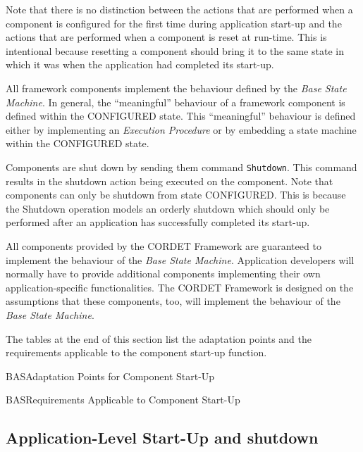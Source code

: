 \documentclass{pnp_article}
\begin{document}
Note that there is no distinction between the actions that are performed when a component is configured for the first time during application start-up and the actions that are performed when a component is reset at run-time. 
This is intentional because resetting a component should bring it to the same state in which it was when the application had completed its start-up.

All framework components implement the behaviour defined by the \textit{Base State Machine}. In general, the “meaningful” behaviour of a framework component is defined within the CONFIGURED state. 
This “meaningful” behaviour is defined either by implementing an \textit{Execution Procedure} or by embedding a state machine within the CONFIGURED state.

Components are shut down by sending them command \texttt{Shutdown}. 
This command results in the shutdown action being executed on the component. 
Note that components can only be shutdown from state CONFIGURED.
This is because the Shutdown operation models an orderly shutdown which should only be performed after an application has successfully completed its start-up. 

All components provided by the CORDET Framework are guaranteed to implement the behaviour of the \textit{Base State Machine}. 
Application developers will normally have to provide additional components implementing their own application-specific functionalities.
The CORDET Framework is designed on the assumptions that these components, too, will implement the behaviour of the \textit{Base State Machine}.

The tables at the end of this section list the adaptation points and the requirements applicable to the component start-up function.

\begin{crAp}{BAS}{Adaptation Points for Component Start-Up}
\end{crAp}

\begin{crReq}{BAS}{Requirements Applicable to Component Start-Up}
\end{crReq}

\subsection{Application-Level Start-Up and shutdown}\label{sec:AppStartUp}

\end{document}
